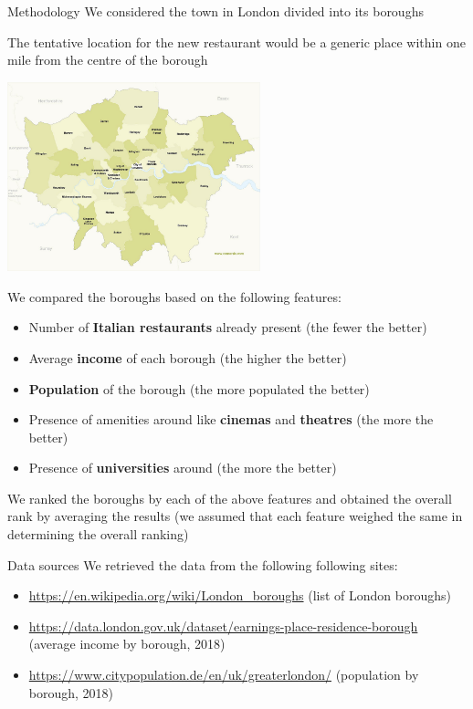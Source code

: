 \documentclass{beamer}
\begin{document}
\begin{frame}[allowframebreaks]{Methodology}
We considered the town in London divided into its boroughs 

The tentative location for the new restaurant would be a generic place within one mile from the centre of the borough
\begin{center}
	\includegraphics[width = 0.55\textwidth, keepaspectratio]{images/london-boroughs.jpg}
\end{center}

\framebreak

We compared the boroughs based on the following features:
\begin{itemize}
	\item Number of \textbf{Italian restaurants} already present (the fewer the better)
	\item Average \textbf{income} of each borough (the higher the better)
	\item \textbf{Population} of the borough (the more populated the better)
	\item Presence of amenities around like \textbf{cinemas} and \textbf{theatres} (the more the better)
	\item Presence of \textbf{universities} around (the more the better)
\end{itemize}

We ranked the boroughs by each of the above features and obtained the overall rank by averaging the results (we assumed that each feature weighed the same in determining the overall ranking) 

\end{frame}

\begin{frame}{Data sources}
We retrieved the data from the following following sites:

\begin{itemize}
	\item \url{https://en.wikipedia.org/wiki/London\_boroughs} (list of London boroughs)
	\item \url{https://data.london.gov.uk/dataset/earnings-place-residence-borough} (average income by borough, 2018)
	\item \url{https://www.citypopulation.de/en/uk/greaterlondon/} (population by borough, 2018)
\end{itemize}
\end{frame}
\end{document}
